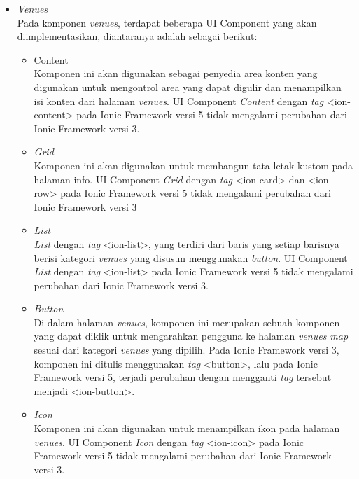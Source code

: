 \begin{itemize}
	\item \textit{Venues}\\
	Pada komponen \textit{venues}, terdapat beberapa UI Component yang akan diimplementasikan, diantaranya adalah sebagai berikut:
		\begin{itemize}
			\item Content \\
		Komponen ini akan digunakan sebagai penyedia area konten yang digunakan untuk mengontrol area yang dapat digulir dan menampilkan isi konten dari halaman \textit{venues}. UI Component \textit{Content} dengan \textit{tag} <ion-content> pada Ionic Framework versi 5 tidak mengalami perubahan dari Ionic Framework versi 3.
			\item \textit{Grid} \\
		Komponen ini akan digunakan untuk membangun tata letak kustom pada halaman info. UI Component \textit{Grid} dengan \textit{tag} <ion-card> dan <ion-row> pada Ionic Framework versi 5 tidak mengalami perubahan dari Ionic Framework versi 3

\newpage		
		
			\item \textit{List} \\
		\textit{List} dengan \textit{tag} <ion-list>, yang terdiri dari baris yang setiap barisnya berisi kategori \textit{venues} yang disusun menggunakan \textit{button}. UI Component \textit{List} dengan \textit{tag} <ion-list> pada Ionic Framework versi 5 tidak mengalami perubahan dari Ionic Framework versi 3.
			\item \textit{Button} \\
		Di dalam halaman \textit{venues}, komponen ini merupakan sebuah komponen yang dapat diklik untuk mengarahkan pengguna ke halaman \textit{venues map} sesuai dari kategori \textit{venues} yang dipilih. Pada Ionic Framework versi 3, komponen ini ditulis menggunakan \textit{tag} <button>, lalu pada Ionic Framework versi 5, terjadi perubahan dengan mengganti \textit{tag} tersebut menjadi <ion-button>.
			\item \textit{Icon} \\
		Komponen ini akan digunakan untuk menampilkan ikon pada halaman \textit{venues}. UI Component \textit{Icon} dengan \textit{tag} <ion-icon> pada Ionic Framework versi 5 tidak mengalami perubahan dari Ionic Framework versi 3.
		\end{itemize}
		

\end{itemize}
